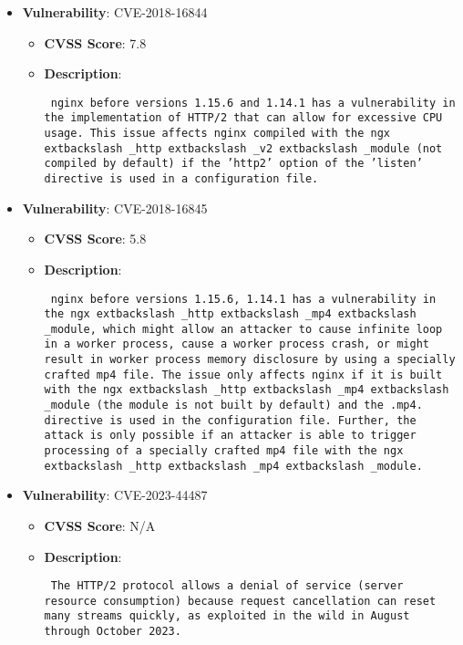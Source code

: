 \documentclass{article}
\begin{document}
\begin{itemize}
        \item \textbf{Vulnerability}: CVE-2018-16844
        \begin{itemize}
            \item \textbf{CVSS Score}:  7.8 
            \item \textbf{Description}: \parbox{\linewidth}{\texttt{ nginx before versions 1.15.6 and 1.14.1 has a vulnerability in the implementation of HTTP/2 that can allow for excessive CPU usage. This issue affects nginx compiled with the ngx	extbackslash _http	extbackslash _v2	extbackslash _module (not compiled by default) if the 'http2' option of the 'listen' directive is used in a configuration file. }}
        \end{itemize}
    
        \item \textbf{Vulnerability}: CVE-2018-16845
        \begin{itemize}
            \item \textbf{CVSS Score}:  5.8 
            \item \textbf{Description}: \parbox{\linewidth}{\texttt{ nginx before versions 1.15.6, 1.14.1 has a vulnerability in the ngx	extbackslash _http	extbackslash _mp4	extbackslash _module, which might allow an attacker to cause infinite loop in a worker process, cause a worker process crash, or might result in worker process memory disclosure by using a specially crafted mp4 file. The issue only affects nginx if it is built with the ngx	extbackslash _http	extbackslash _mp4	extbackslash _module (the module is not built by default) and the .mp4. directive is used in the configuration file. Further, the attack is only possible if an attacker is able to trigger processing of a specially crafted mp4 file with the ngx	extbackslash _http	extbackslash _mp4	extbackslash _module. }}
        \end{itemize}
    
        \item \textbf{Vulnerability}: CVE-2023-44487
        \begin{itemize}
            \item \textbf{CVSS Score}:  N/A 
            \item \textbf{Description}: \parbox{\linewidth}{\texttt{ The HTTP/2 protocol allows a denial of service (server resource consumption) because request cancellation can reset many streams quickly, as exploited in the wild in August through October 2023. }}
        \end{itemize}
    

\end{itemize}
\end{document}
